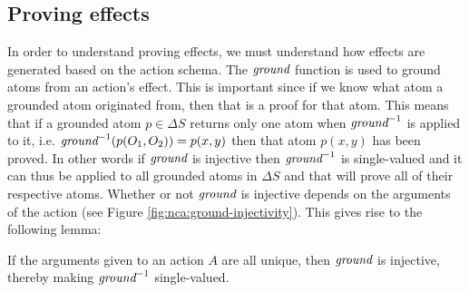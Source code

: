 \documentclass[../Master.tex]{subfiles}
\begin{document}
\subsection{Proving effects}
In order to understand proving effects, we must understand how effects are generated based on the action schema.
The $\textit{ground}$ function is used to ground atoms from an action's effect. This is important since if we know what atom a grounded atom originated from, then that is a proof for that atom. This means that if a grounded atom $p \in \Delta S$ returns only one atom when $\textit{ground} ^{-1}$ is applied to it, i.e. $\textit{ground} ^{-1}(p(O_1,O_2)) = {p(x,y)}$ then that atom $p(x,y)$ has been proved. In other words if $\textit{ground}$ is injective then $\textit{ground} ^{-1}$ is single-valued and it can thus be applied to all grounded atoms in $\Delta S$ and that will prove all of their respective atoms.
Whether or not $\textit{ground}$ is injective depends on the arguments of the action (see Figure \ref*{fig:nca:ground-injectivity}).
This gives rise to the following lemma:
\begin{lemma}
If the arguments given to an action $A$ are all unique, then $\textit{ground}$ is injective, thereby making $\textit{ground} ^{-1}$ single-valued.
\end{lemma}
\end{document}

